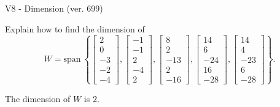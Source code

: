\begin{exercise}
  \begin{exerciseTitle}V8 - Dimension (ver. 699)\end{exerciseTitle}
  \begin{exerciseStatement}
    Explain how to find the dimension of 
\[W=\mathrm{span}\ \left\{\left[\begin{array}{r}
2 \\
0 \\
-3 \\
-2 \\
-4
\end{array}\right] , \left[\begin{array}{r}
-1 \\
-1 \\
2 \\
-4 \\
2
\end{array}\right] , \left[\begin{array}{r}
8 \\
2 \\
-13 \\
2 \\
-16
\end{array}\right] , \left[\begin{array}{r}
14 \\
6 \\
-24 \\
16 \\
-28
\end{array}\right] , \left[\begin{array}{r}
14 \\
4 \\
-23 \\
6 \\
-28
\end{array}\right]\right\}.\]



  \end{exerciseStatement}
  \begin{exerciseAnswer}
   The dimension of \(W\) is  \(2\).
  


  \end{exerciseAnswer}
\end{exercise}